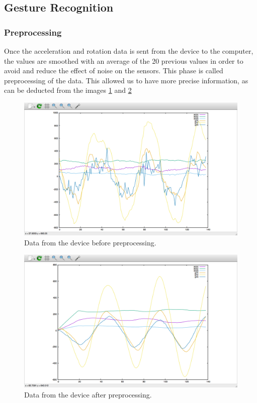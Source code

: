 \subsection{Gesture Recognition}
\subsubsection{Preprocessing}
Once the acceleration and rotation data is sent from the device to the computer,
 the values are smoothed with an average of the 20 previous values in order to avoid and reduce the effect of noise on the sensors.
 This phase is called preprocessing of the data. 
 This allowed us to have more precise information, as can be deducted from the images  \ref{fig:figure2} and \ref{fig:figure3}

\begin{figure}[!h]
\centering
\includegraphics[width=0.9\columnwidth]{img/raw}
\caption{Data from the device before preprocessing.}
\label{fig:figure2}
\end{figure}

\begin{figure}[!h]
\centering
\includegraphics[width=0.9\columnwidth]{img/20}
\caption{Data from the device after preprocessing.}
\label{fig:figure3}
\end{figure}

